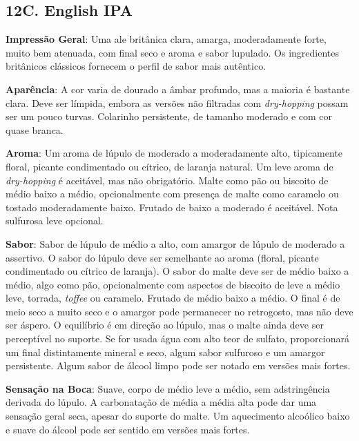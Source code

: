\subsection*{12C. English IPA}

\textbf{Impressão Geral}: Uma ale britânica clara, amarga, moderadamente forte, muito bem atenuada, com final seco e aroma e sabor lupulado. Os ingredientes britânicos clássicos fornecem o perfil de sabor mais autêntico.

\textbf{Aparência}: A cor varia de dourado a âmbar profundo, mas a maioria é bastante clara. Deve ser límpida, embora as versões não filtradas com \textit{dry-hopping} possam ser um pouco turvas. Colarinho persistente, de tamanho moderado e com cor quase branca.

\textbf{Aroma}: Um aroma de lúpulo de moderado a moderadamente alto, tipicamente floral, picante condimentado ou cítrico, de laranja natural. Um leve aroma de \textit{dry-hopping} é aceitável, mas não obrigatório. Malte como pão ou biscoito de médio baixo a médio, opcionalmente com presença de malte como caramelo ou tostado moderadamente baixo. Frutado de baixo a moderado é aceitável. Nota sulfurosa leve opcional.

\textbf{Sabor}: Sabor de lúpulo de médio a alto, com amargor de lúpulo de moderado a assertivo. O sabor do lúpulo deve ser semelhante ao aroma (floral, picante condimentado ou cítrico de laranja). O sabor do malte deve ser de médio baixo a médio, algo como pão, opcionalmente com aspectos de biscoito de leve a médio leve, torrada, \textit{toffee} ou caramelo. Frutado de médio baixo a médio. O final é de meio seco a muito seco e o amargor pode permanecer no retrogosto, mas não deve ser áspero. O equilíbrio é em direção ao lúpulo, mas o malte ainda deve ser perceptível no suporte. Se for usada água com alto teor de sulfato, proporcionará um final distintamente mineral e seco, algum sabor sulfuroso e um amargor persistente. Algum sabor de álcool limpo pode ser notado em versões mais fortes.

\textbf{Sensação na Boca}: Suave, corpo de médio leve a médio, sem adstringência derivada do lúpulo. A carbonatação de média a média alta pode dar uma sensação geral seca, apesar do suporte do malte. Um aquecimento alcoólico baixo e suave do álcool pode ser sentido em versões mais fortes.


